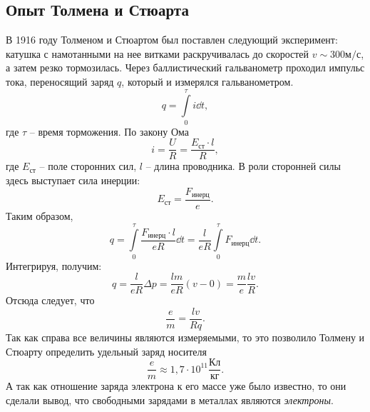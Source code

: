     \subsection{Опыт Толмена и Стюарта}
        В 1916 году Толменом и Стюартом был поставлен следующий эксперимент:
        катушка с намотанными на нее витками раскручивалась до скоростей
        \( v \sim 300 \text{м}/\text{с} \), а затем резко тормозилась. Через
        баллистический гальванометр проходил импульс тока, переносящий заряд
        \( q \), который и измерялся гальванометром. 
        \[
            q = \int\limits_0^\tau i\dd t,
        \]
        где \( \tau \) -- время торможения. По закону Ома
        \[
            i = \frac{U}{R} = \frac{E_{\textit{ст}}\cdot l}{R},
        \]
        где \( E_{\textit{ст}} \) -- поле сторонних сил, \( l \) -- длина
        проводника. В роли сторонней силы здесь выступает сила инерции:
        \[
            E_{\textit{ст}} = \frac{F_{\textit{инерц}}}{e}.
        \]
        Таким образом,
        \[
            q = \int\limits_0^\tau \frac{F_{\textit{инерц}}\cdot l}{eR}\dd t =
            \frac{l}{eR} \int\limits_0^\tau F_\textit{инерц}\dd t.
        \]
        Интегрируя, получим:
        \[
            q = \frac{l}{eR}\Delta p = \frac{lm}{eR}(v - 0) =
            \frac{m}{e}\frac{lv}{R}.
        \]
        Отсюда следует, что
        \[
            \frac{e}{m} = \frac{lv}{Rq}.
        \]
        Так как справа все величины являются измеряемыми, то это позволило
        Толмену и Стюарту определить удельный заряд носителя
        \[
            \frac{e}{m} \approx 1,7 \cdot 10^{11} \frac{\text{Кл}}{\text{кг}}.
        \]
        А так как отношение заряда электрона к его массе уже было известно, то
        они сделали вывод, что свободными зарядами в металлах являются
        \textit{электроны}.
    

